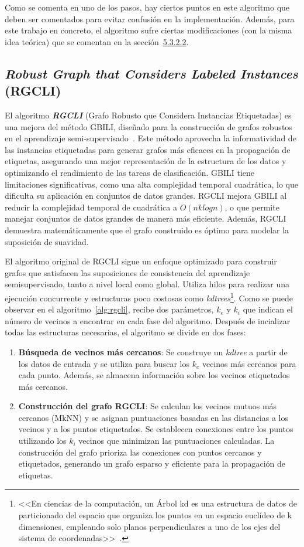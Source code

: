 Como se comenta en uno de los pasos, hay ciertos puntos en este algoritmo que deben ser comentados para evitar confusión en la implementación. Además, para este trabajo en concreto, el algoritmo sufre ciertas modificaciones (con la misma idea teórica) que se comentan en la sección~\hyperref[sec5:gbili]{5.3.2.2}.
\clearpage
\subsection{\textit{Robust Graph that Considers Labeled Instances} (RGCLI)}\label{sec3:rgcli}
El algoritmo \textbf{\textit{RGCLI}} (Grafo Robusto que Considera Instancias Etiquetadas) es una mejora del método GBILI, diseñado para la construcción de grafos robustos en el aprendizaje semi-supervisado~\cite{rgcli}. Este método aprovecha la informatividad de las instancias etiquetadas para generar grafos más eficaces en la propagación de etiquetas, asegurando una mejor representación de la estructura de los datos y optimizando el rendimiento de las tareas de clasificación. GBILI tiene limitaciones significativas, como una alta complejidad temporal cuadrática, lo que dificulta su aplicación en conjuntos de datos grandes. RGCLI mejora GBILI al reducir la complejidad temporal de cuadrática a $O(nklogn)$, o que permite manejar conjuntos de datos grandes de manera más eficiente. Además, RGCLI demuestra matemáticamente que el grafo construido es óptimo para modelar la suposición de suavidad.

El algoritmo original de RGCLI sigue un enfoque optimizado para construir grafos que satisfacen las suposiciones de consistencia del aprendizaje semisupervisado, tanto a nivel local como global. Utiliza hilos para realizar una ejecución concurrente y estructuras poco costosas como \textit{kdtrees}\footnote{<<En ciencias de la computación, un Árbol kd es una estructura de datos de particionado del espacio que organiza los puntos en un espacio euclídeo de k dimensiones, empleando solo planos perpendiculares a uno de los ejes del sistema de coordenadas>>~\cite{eswiki:kdtree}.}. Como se puede observar en el algoritmo~\ref{alg:rgcli}, recibe dos parámetros, $k_e$ y $k_i$ que indican el número de vecinos a encontrar en cada fase del algoritmo. Después de incializar todas las estructuras necesarias, el algoritmo se divide en dos fases:
\begin{enumerate}
	\item \textbf{Búsqueda de vecinos más cercanos}: Se construye un \textit{kdtree} a partir de los datos de entrada y se utiliza para buscar los $k_e$ vecinos más cercanos para cada punto. Además, se almacena información sobre los vecinos etiquetados más cercanos.
	\item \textbf{Construcción del grafo RGCLI}: Se calculan los vecinos mutuos más cercanos (MkNN) y se asignan puntuaciones basadas en las distancias a los vecinos y a los puntos etiquetados. Se establecen conexiones entre los puntos utilizando los $k_i$ vecinos que minimizan las puntuaciones calculadas. La construcción del grafo prioriza las conexiones con puntos cercanos y etiquetados, generando un grafo esparso y eficiente para la propagación de etiquetas.
\end{enumerate}

